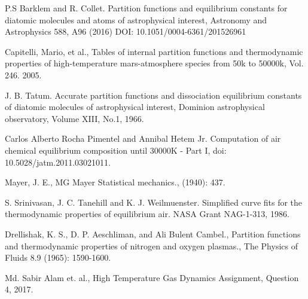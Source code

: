 \documentclass[]{aelab_aiaa-tc}%
\begin{document}
\begin{thebibliography}{9}%

 P.S Barklem and 	R. Collet. Partition functions and equilibrium constants for diatomic molecules and atoms of astrophysical interest, Astronomy and Astrophysics 588, A96 (2016)
 DOI: 10.1051/0004-6361/201526961
 
 Capitelli, Mario, et al., Tables of internal partition functions and thermodynamic properties of high-temperature
 mars-atmosphere species from 50k to 50000k, Vol. 246. 2005.
 
 J. B. Tatum. Accurate partition functions and dissociation equilibrium constants of diatomic molecules of astrophysical interest, Dominion astrophysical observatory, Volume XIII, No.1, 1966.
 
 Carlos Alberto Rocha Pimentel and Annibal Hetem Jr. Computation of air chemical
 equilibrium composition until 30000K - Part I, doi: 10.5028/jatm.2011.03021011.
 
 Mayer, J. E., MG Mayer Statistical mechanics., (1940): 437.
 
 S. Srinivasan, J. C. Tanehill and K. J. Weilmuenster. Simplified curve fits for the thermodynamic properties of equilibrium air. NASA Grant NAG-1-313, 1986.
 
 Drellishak, K. S., D. P. Aeschliman, and Ali Bulent Cambel., Partition functions and thermodynamic properties of nitrogen
 and oxygen plasmas., The Physics of Fluids 8.9 (1965): 1590-1600.
 
 Md. Sabir Alam et. al., High Temperature Gas Dynamics Assignment, Question 4, 2017.
 
\end{thebibliography}
\end{document}
